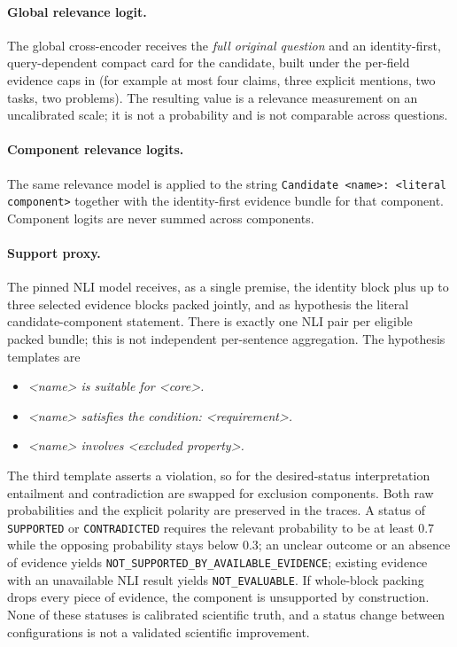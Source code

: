 \documentclass[11pt,a4paper]{article}
\begin{document}
\paragraph{Global relevance logit.} The global cross-encoder receives the \emph{full original question} and an identity-first, query-dependent compact card for the candidate, built under the per-field evidence caps in  (for example at most four claims, three explicit mentions, two tasks, two problems). The resulting value is a relevance measurement on an uncalibrated scale; it is not a probability and is not comparable across questions.

\paragraph{Component relevance logits.} The same relevance model is applied to the string \texttt{Candidate <name>: <literal component>} together with the identity-first evidence bundle for that component. Component logits are never summed across components.

\paragraph{Support proxy.} The pinned NLI model receives, as a single premise, the identity block plus up to three selected evidence blocks packed jointly, and as hypothesis the literal candidate-component statement. There is exactly one NLI pair per eligible packed bundle; this is not independent per-sentence aggregation. The hypothesis templates are

\begin{itemize}
\item \emph{<name> is suitable for <core>.}
\item \emph{<name> satisfies the condition: <requirement>.}
\item \emph{<name> involves <excluded property>.}
\end{itemize}

The third template asserts a violation, so for the desired-status interpretation entailment and contradiction are swapped for exclusion components. Both raw probabilities and the explicit polarity are preserved in the traces. A status of \texttt{SUPPORTED} or \texttt{CONTRADICTED} requires the relevant probability to be at least 0.7 while the opposing probability stays below 0.3; an unclear outcome or an absence of evidence yields \texttt{NOT\_SUPPORTED\_BY\_}\allowbreak\texttt{AVAILABLE\_EVIDENCE}; existing evidence with an unavailable NLI result yields \texttt{NOT\_EVALUABLE}. If whole-block packing drops every piece of evidence, the component is unsupported by construction. None of these statuses is calibrated scientific truth, and a status change between configurations is not a validated scientific improvement.
\end{document}
